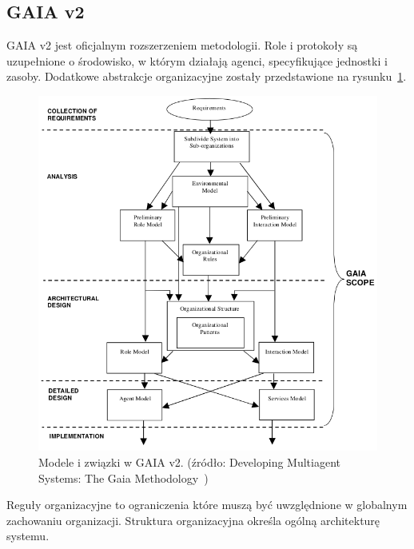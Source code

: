 \documentclass[11pt]{report}
\begin{document}
    \subsection{GAIA v2}
    GAIA v2 jest oficjalnym rozszerzeniem metodologii.
    Role i protokoły są uzupełnione o środowisko, w którym działają agenci, specyfikujące jednostki i zasoby.
    Dodatkowe abstrakcje organizacyjne zostały przedstawione na rysunku~\ref{fig:gaia_v2}.
    \begin{figure}[!ht]
        \centering
        \includegraphics[width=\linewidth]{fig/gaia2 models.png}
        \caption{Modele i związki w GAIA v2. (źródło: Developing Multiagent Systems: The Gaia Methodology~\cite{Zambonelli2003})}
        \label{fig:gaia_v2}
    \end{figure}
    Reguły organizacyjne to ograniczenia które muszą być uwzględnione w globalnym zachowaniu organizacji.
    Struktura organizacyjna określa ogólną architekturę systemu.
\end{document}

